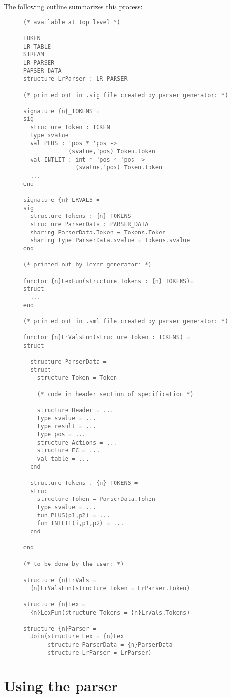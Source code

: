 The following outline summarizes this process:
\begin{quote}
\begin{verbatim}
(* available at top level *)

TOKEN
LR_TABLE
STREAM
LR_PARSER
PARSER_DATA
structure LrParser : LR_PARSER

(* printed out in .sig file created by parser generator: *)

signature {n}_TOKENS = 
sig
  structure Token : TOKEN
  type svalue
  val PLUS : 'pos * 'pos ->
             (svalue,'pos) Token.token
  val INTLIT : int * 'pos * 'pos ->
               (svalue,'pos) Token.token
  ...
end

signature {n}_LRVALS =
sig
  structure Tokens : {n}_TOKENS
  structure ParserData : PARSER_DATA
  sharing ParserData.Token = Tokens.Token
  sharing type ParserData.svalue = Tokens.svalue
end

(* printed out by lexer generator: *)

functor {n}LexFun(structure Tokens : {n}_TOKENS)=
struct
  ...
end

(* printed out in .sml file created by parser generator: *)

functor {n}LrValsFun(structure Token : TOKENS) =
struct

  structure ParserData =
  struct
    structure Token = Token

    (* code in header section of specification *)

    structure Header = ...
    type svalue = ...
    type result = ...
    type pos = ...
    structure Actions = ...
    structure EC = ...
    val table = ...
  end

  structure Tokens : {n}_TOKENS =
  struct
    structure Token = ParserData.Token
    type svalue = ...
    fun PLUS(p1,p2) = ...
    fun INTLIT(i,p1,p2) = ... 
  end

end

(* to be done by the user: *)
 
structure {n}LrVals =
  {n}LrValsFun(structure Token = LrParser.Token)

structure {n}Lex = 
  {n}LexFun(structure Tokens = {n}LrVals.Tokens)

structure {n}Parser =
  Join(structure Lex = {n}Lex
       structure ParserData = {n}ParserData
       structure LrParser = LrParser)
\end{verbatim}
\end{quote}

\section{Using the parser}
